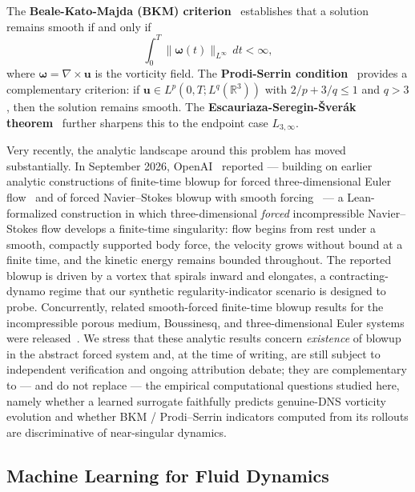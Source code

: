 \documentclass[review]{elsarticle}
\begin{document}
The \textbf{Beale-Kato-Majda (BKM) criterion}~\cite{beale1984remarks} establishes that a solution remains smooth if and only if
\begin{equation}
\int_0^T \|\bm{\omega}(t)\|_{L^\infty} \, dt < \infty,
\label{eq:bkm}
\end{equation}
where $\bm{\omega} = \nabla \times \bm{u}$ is the vorticity field. The \textbf{Prodi-Serrin condition}~\cite{prodi1959teorema,serrin1962interior} provides a complementary criterion: if $\bm{u} \in L^p(0,T; L^q(\mathbb{R}^3))$ with $2/p + 3/q \leq 1$ and $q > 3$, then the solution remains smooth. The \textbf{Escauriaza-Seregin-\v{S}ver\'{a}k theorem}~\cite{escauriaza2003l3infty} further sharpens this to the endpoint case $L_{3,\infty}$.

Very recently, the analytic landscape around this problem has moved substantially. In September 2026, OpenAI~\cite{openai2026ns} reported --- building on earlier analytic constructions of finite-time blowup for forced three-dimensional Euler flow~\cite{cordoba2023eulerforce} and of forced Navier--Stokes blowup with smooth forcing~\cite{buckmaster2023ns} --- a Lean-formalized construction in which three-dimensional \emph{forced} incompressible Navier--Stokes flow develops a finite-time singularity: flow begins from rest under a smooth, compactly supported body force, the velocity grows without bound at a finite time, and the kinetic energy remains bounded throughout. The reported blowup is driven by a vortex that spirals inward and elongates, a contracting-dynamo regime that our synthetic regularity-indicator scenario is designed to probe. Concurrently, related smooth-forced finite-time blowup results for the incompressible porous medium, Boussinesq, and three-dimensional Euler systems were released~\cite{tao2026blowup,alpoge2026euler}. We stress that these analytic results concern \emph{existence} of blowup in the abstract forced system and, at the time of writing, are still subject to independent verification and ongoing attribution debate; they are complementary to --- and do not replace --- the empirical computational questions studied here, namely whether a learned surrogate faithfully predicts genuine-DNS vorticity evolution and whether BKM / Prodi--Serrin indicators computed from its rollouts are discriminative of near-singular dynamics.

\subsection{Machine Learning for Fluid Dynamics}
\label{sec:ml-fluids}
\end{document}
